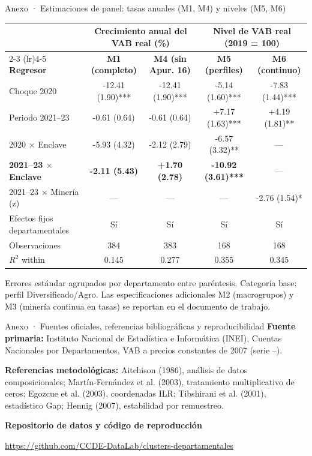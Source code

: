 \documentclass[aspectratio=169,11pt]{beamer}
\begin{document}
\begin{frame}[t]{Anexo · Estimaciones de panel: tasas anuales (M1, M4) y niveles (M5, M6)}
\vspace{.10cm}\centering
{\scriptsize\setlength{\tabcolsep}{2.5pt}
\begin{tabular}{lcccc}
\toprule
& \multicolumn{2}{c}{\textbf{Crecimiento anual del VAB real (\%)}} & \multicolumn{2}{c}{\textbf{Nivel de VAB real (2019 = 100)}} \\
\cmidrule(lr){2-3} \cmidrule(lr){4-5}
\textbf{Regresor} & \textbf{M1 (completo)} & \textbf{M4 (sin Apur. 16)} & \textbf{M5 (perfiles)} & \textbf{M6 (continuo)} \\
\midrule
Choque 2020 & -12.41 (1.90)*** & -12.41 (1.90)*** & -5.14 (1.60)*** & -7.83 (1.44)*** \\
Periodo 2021--23 & -0.61 (0.64) & -0.61 (0.64) & +7.17 (1.63)*** & +4.19 (1.81)** \\
2020 $\times$ Enclave & -5.93 (4.32) & -2.12 (2.79) & -6.57 (3.32)** & --- \\
\textbf{2021--23 $\times$ Enclave} & \textbf{-2.11 (5.43)} & \textbf{+1.70 (2.78)} & \textbf{-10.92 (3.61)***} & --- \\
2021--23 $\times$ Minería (z) & --- & --- & --- & -2.76 (1.54)* \\
\midrule
Efectos fijos departamentales & Sí & Sí & Sí & Sí \\
Observaciones & 384 & 383 & 168 & 168 \\
$R^2$ within & 0.145 & 0.277 & 0.355 & 0.345 \\
\bottomrule
\end{tabular}
}
\par\vspace{.12cm}\RaggedRight\footnotesize
Errores estándar agrupados por departamento entre paréntesis. Categoría base: perfil Diversificado/Agro. Las especificaciones adicionales M2 (macrogrupos) y M3 (minería continua en tasas) se reportan en el documento de trabajo.
\end{frame}

\begin{frame}[t]{Anexo · Fuentes oficiales, referencias bibliográficas y reproducibilidad}
\vspace{.06cm}
\small
\textbf{Fuente primaria:} Instituto Nacional de Estadística e Informática (INEI), Cuentas Nacionales por Departamentos, VAB a precios constantes de 2007 (serie \RateStart--\RateEnd).\par\medskip
\textbf{Referencias metodológicas:} Aitchison (1986), análisis de datos composicionales; Martín-Fernández et al. (2003), tratamiento multiplicativo de ceros; Egozcue et al. (2003), coordenadas ILR; Tibshirani et al. (2001), estadístico Gap; Hennig (2007), estabilidad por remuestreo.\par\bigskip
\textbf{Repositorio de datos y código de reproducción}\par\smallskip
\url{https://github.com/CCDE-DataLab/clusters-departamentales}
\end{frame}
\end{document}
